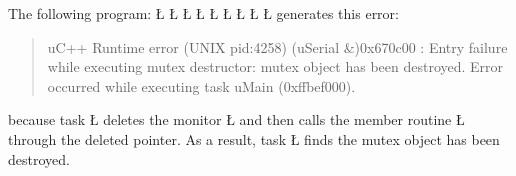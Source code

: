 \documentclass[openright,twoside]{report}
\begin{document}
The following program:
\LGinlinefalse\LGbegin\lgrinde
\L{}
\L{}
\L{\LB{}}
\L{\LB{\};}}
\L{}
\L{\LB{}}
\L{\LB{}}
\CE{}\L{\LB{}}
\CE{}\L{\LB{\}}}
\endlgrinde\LGend
generates this error:
\begin{quote}
\BGfont
uC++ Runtime error (UNIX pid:4258) (uSerial \&)0x670c00 : Entry failure while executing mutex destructor: mutex object has been destroyed.
Error occurred while executing task uMain (0xffbef000).
\end{quote}
because task \LGinlinetrue\LGbegin\lgrinde\L{}\endlgrinde\LGend{} deletes the monitor \LGinlinetrue\LGbegin\lgrinde\L{}\endlgrinde\LGend{} and then calls the member routine \LGinlinetrue\LGbegin\lgrinde\L{}\endlgrinde\LGend{} through the deleted pointer.
As a result, task \LGinlinetrue\LGbegin\lgrinde\L{}\endlgrinde\LGend{} finds the mutex object has been destroyed.
\end{document}
